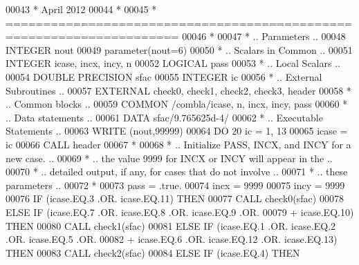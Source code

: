\begin{DoxyCode}
00043 \textcolor{comment}{*     April 2012}
00044 \textcolor{comment}{*}
00045 \textcolor{comment}{*  =====================================================================}
00046 \textcolor{comment}{*}
00047 \textcolor{comment}{*     .. Parameters ..}
00048       \textcolor{keywordtype}{INTEGER}          nout
00049       parameter(nout=6)
00050 \textcolor{comment}{*     .. Scalars in Common ..}
00051       \textcolor{keywordtype}{INTEGER}          icase, incx, incy, n
00052       \textcolor{keywordtype}{LOGICAL}          pass
00053 \textcolor{comment}{*     .. Local Scalars ..}
00054       \textcolor{keywordtype}{DOUBLE PRECISION} sfac
00055       \textcolor{keywordtype}{INTEGER}          ic
00056 \textcolor{comment}{*     .. External Subroutines ..}
00057       \textcolor{keywordtype}{EXTERNAL}         check0, check1, check2, check3, header
00058 \textcolor{comment}{*     .. Common blocks ..}
00059       \textcolor{keyword}{COMMON}           /combla/icase, n, incx, incy, pass
00060 \textcolor{comment}{*     .. Data statements ..}
00061       \textcolor{keyword}{DATA}             sfac/9.765625d-4/
00062 \textcolor{comment}{*     .. Executable Statements ..}
00063       \textcolor{keyword}{WRITE} (nout,99999)
00064       \textcolor{keywordflow}{DO} 20 ic = 1, 13
00065          icase = ic
00066          \textcolor{keyword}{CALL }header
00067 \textcolor{comment}{*}
00068 \textcolor{comment}{*        .. Initialize  PASS,  INCX,  and INCY for a new case. ..}
00069 \textcolor{comment}{*        .. the value 9999 for INCX or INCY will appear in the ..}
00070 \textcolor{comment}{*        .. detailed  output, if any, for cases  that do not involve ..}
00071 \textcolor{comment}{*        .. these parameters ..}
00072 \textcolor{comment}{*}
00073          pass = .true.
00074          incx = 9999
00075          incy = 9999
00076          \textcolor{keywordflow}{IF} (icase.EQ.3 .OR. icase.EQ.11) \textcolor{keywordflow}{THEN}
00077             \textcolor{keyword}{CALL }check0(sfac)
00078          \textcolor{keywordflow}{ELSE} \textcolor{keywordflow}{IF} (icase.EQ.7 .OR. icase.EQ.8 .OR. icase.EQ.9 .OR.
00079      +            icase.EQ.10) \textcolor{keywordflow}{THEN}
00080             \textcolor{keyword}{CALL }check1(sfac)
00081          \textcolor{keywordflow}{ELSE} \textcolor{keywordflow}{IF} (icase.EQ.1 .OR. icase.EQ.2 .OR. icase.EQ.5 .OR.
00082      +            icase.EQ.6 .OR. icase.EQ.12 .OR. icase.EQ.13) \textcolor{keywordflow}{THEN}
00083             \textcolor{keyword}{CALL }check2(sfac)
00084          \textcolor{keywordflow}{ELSE} \textcolor{keywordflow}{IF} (icase.EQ.4) \textcolor{keywordflow}{THEN}

\end{DoxyCode}
